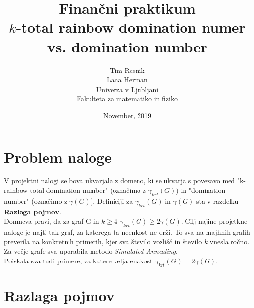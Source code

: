 \documentclass[a4paper]{article}
\title{Finančni praktikum \\\vspace{2cm} {\huge $k$-total rainbow domination numer vs. domination number}\vspace{2cm}}
\author{Tim Resnik \\[1.5mm] Lana Herman \\[1.5mm]\vspace{6cm}
Univerza v Ljubljani \\[1.5mm]
Fakulteta za matematiko in fiziko \vspace{2cm}}
\date{November, 2019}
\begin{document}
\begin{titlepage}
\clearpage \maketitle
\thispagestyle{empty}
\end{titlepage}

\section{Problem naloge}

V projektni nalogi se bova ukvarjala z domeno, ki se ukvarja s povezavo med "k-rainbow total domination number" (označimo z $\gamma_{krt}(G)$)  in "domination number" (označimo z $\gamma(G)$). Definiciji za $\gamma_{krt}(G)$ in $\gamma(G)$ sta v razdelku \textbf{Razlaga pojmov}.\\
Domneva pravi, da za graf G in $k \geq 4$  $\gamma_{krt}(G) \geq 2\gamma(G)$. Cilj najine projetkne naloge je najti tak graf, za katerega ta neenkost ne drži. To sva na majhnih grafih preverila na konkretnih primerih, kjer sva število vozlišč in število $k$ vnesla ročno. Za večje grafe sva uporabila metodo \textit{Simulated Annealing}.\\
Poiskala sva tudi primere, za katere velja enakost $\gamma_{krt}(G) = 2\gamma(G)$.

\section{Razlaga pojmov}
\end{document}
